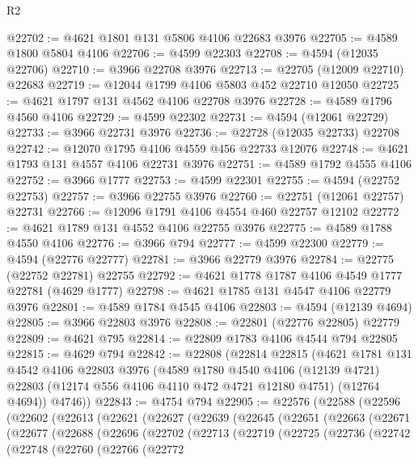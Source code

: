 \begin{lexlean}{R2}
\begin{coremodule}
@22702 := @4621 @1801 @131 @5806 @4106 @22683 @3976
@22705 := @4589 @1800 @5804 @4106
@22706 := @4599 @22303
@22708 := @4594 (@12035 @22706)
@22710 := @3966 @22708 @3976
@22713 := @22705 (@12009 @22710) @22683
@22719 := @12044 @1799 @4106 @5803 @452 @22710 @12050
@22725 := @4621 @1797 @131 @4562 @4106 @22708 @3976
@22728 := @4589 @1796 @4560 @4106
@22729 := @4599 @22302
@22731 := @4594 (@12061 @22729)
@22733 := @3966 @22731 @3976
@22736 := @22728 (@12035 @22733) @22708
@22742 := @12070 @1795 @4106 @4559 @456 @22733 @12076
@22748 := @4621 @1793 @131 @4557 @4106 @22731 @3976
@22751 := @4589 @1792 @4555 @4106
@22752 := @3966 @1777
@22753 := @4599 @22301
@22755 := @4594 (@22752 @22753)
@22757 := @3966 @22755 @3976
@22760 := @22751 (@12061 @22757) @22731
@22766 := @12096 @1791 @4106 @4554 @460 @22757 @12102
@22772 := @4621 @1789 @131 @4552 @4106 @22755 @3976
@22775 := @4589 @1788 @4550 @4106
@22776 := @3966 @794
@22777 := @4599 @22300
@22779 := @4594 (@22776 @22777)
@22781 := @3966 @22779 @3976
@22784 := @22775 (@22752 @22781) @22755
@22792 := @4621 @1778 @1787 @4106 @4549 @1777 @22781 (@4629 @1777)
@22798 := @4621 @1785 @131 @4547 @4106 @22779 @3976
@22801 := @4589 @1784 @4545 @4106
@22803 := @4594 (@12139 @4694)
@22805 := @3966 @22803 @3976
@22808 := @22801 (@22776 @22805) @22779
@22809 := @4621 @795
@22814 := @22809 @1783 @4106 @4544 @794 @22805
@22815 := @4629 @794
@22842 := @22808
    (@22814
      @22815
      (@4621
        @1781
        @131
        @4542
        @4106
        @22803
        @3976
        (@4589
          @1780
          @4540
          @4106
          (@12139 @4721)
          @22803
          (@12174 @556 @4106 @4110 @472 @4721 @12180 @4751)
          (@12764 @4694))
        @4746))
@22843 := @4754 @794
@22905 := @22576
    (@22588
      (@22596
        (@22602
          (@22613
            (@22621
              (@22627
                (@22639
                  (@22645
                    (@22651
                      (@22663
                        (@22671
                          (@22677
                            (@22688
                              (@22696
                                (@22702
                                  (@22713
                                    (@22719
                                      (@22725
                                        (@22736
                                          (@22742
                                            (@22748
                                              (@22760
                                                (@22766
                                                  (@22772

\end{coremodule}
\end{lexlean}
